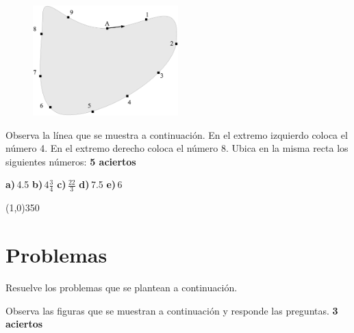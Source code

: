 \documentclass[11pt]{article}
\begin{document}
\begin{figure}[h!]
    \begin{center}
        \includegraphics[width=0.5\textwidth]{./pista}
    \end{center}
\end{figure}

\newpage

Observa la l\'inea que se muestra a continuaci\'on. En el extremo izquierdo
coloca el n\'umero 4. En el extremo derecho coloca el n\'umero 8. Ubica en la
misma recta los siguientes n\'umeros:  \hfill \textbf{5 aciertos}

\textbf{a)}\,4.5 \hfill \textbf{b)}\,$4\displaystyle\frac{3}{4}$ \hfill
\textbf{c)}\,$\displaystyle\frac{22}{3} $ \hfill \textbf{d)}\,7.5 \hfill
\textbf{e)}\,6

\vspace{1.5cm}

\begin{center}
\line(1,0){350}
\end{center}

\vspace{1.5cm}

\section{Problemas}
Resuelve los problemas que se plantean a continuaci\'on.

\vspace{5mm}

Observa las figuras que se muestran a continuaci\'on y responde las preguntas.
\hfill \textbf{3 aciertos}
\end{document}
